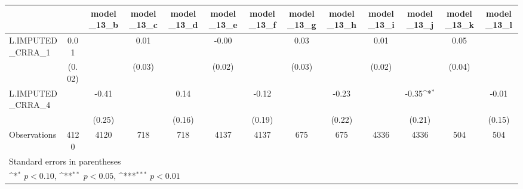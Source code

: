 {
\def\sym#1{\ifmmode^{#1}\else\(^{#1}\)\fi}
\begin{tabular}{l*{12}{c}}
\toprule
                &\multicolumn{1}{c}{}&\multicolumn{1}{c}{model\_13\_b}&\multicolumn{1}{c}{model\_13\_c}&\multicolumn{1}{c}{model\_13\_d}&\multicolumn{1}{c}{model\_13\_e}&\multicolumn{1}{c}{model\_13\_f}&\multicolumn{1}{c}{model\_13\_g}&\multicolumn{1}{c}{model\_13\_h}&\multicolumn{1}{c}{model\_13\_i}&\multicolumn{1}{c}{model\_13\_j}&\multicolumn{1}{c}{model\_13\_k}&\multicolumn{1}{c}{model\_13\_l}\\
\midrule
L.IMPUTED\_CRRA\_1&     0.01         &                  &     0.01         &                  &    -0.00         &                  &     0.03         &                  &     0.01         &                  &     0.05         &                  \\
                &   (0.02)         &                  &   (0.03)         &                  &   (0.02)         &                  &   (0.03)         &                  &   (0.02)         &                  &   (0.04)         &                  \\
\addlinespace
L.IMPUTED\_CRRA\_4&                  &    -0.41         &                  &     0.14         &                  &    -0.12         &                  &    -0.23         &                  &    -0.35\sym{*}  &                  &    -0.01         \\
                &                  &   (0.25)         &                  &   (0.16)         &                  &   (0.19)         &                  &   (0.22)         &                  &   (0.21)         &                  &   (0.15)         \\
\midrule
Observations    &     4120         &     4120         &      718         &      718         &     4137         &     4137         &      675         &      675         &     4336         &     4336         &      504         &      504         \\
\bottomrule
\multicolumn{13}{l}{\footnotesize Standard errors in parentheses}\\
\multicolumn{13}{l}{\footnotesize \sym{*} \(p<0.10\), \sym{**} \(p<0.05\), \sym{***} \(p<0.01\)}\\
\end{tabular}
}
